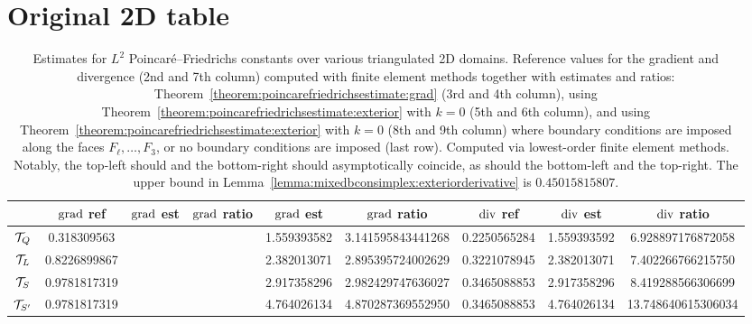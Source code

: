 \documentclass[10pt,a4paper]{article}
\begin{document}
\color{black}









\section{Original 2D table}



\begin{table}[t]
    \centering
    \begin{tabular}{|c|c|c|c|c|c|c|c|c|}
        \hline
                        & $\operatorname{grad}$ ref  & $\operatorname{grad}$ est & $\operatorname{grad}$ ratio      & $\operatorname{grad}$ est & $\operatorname{grad}$ ratio      & $\operatorname{div}$ ref  & $\operatorname{div}$ est  & $\operatorname{div}$ ratio \\ 
        \hline
        ${\mathcal T}_{Q}$     & 0.318309563  &             &                    & 1.559393582 & 3.141595843441268  & 0.2250565284       & 1.559393592        &  6.928897176872058 \\ 
        \hline
        ${\mathcal T}_{L}$     & 0.8226899867 &             &                    & 2.382013071 & 2.895395724002629  & 0.3221078945       & 2.382013071        &  7.402266766215750 \\ 
        \hline
        ${\mathcal T}_{S}$     & 0.9781817319 &             &                    & 2.917358296 & 2.982429747636027  & 0.3465088853       & 2.917358296        &  8.419288566306699 \\ 
        \hline
        ${\mathcal T}_{S'}$    & 0.9781817319 &             &                    & 4.764026134 & 4.870287369552950  & 0.3465088853       & 4.764026134        & 13.748640615306034 \\ 
        \hline
    \end{tabular}
    \caption{
    Estimates for $L^2$ Poincar\'e--Friedrichs constants over various triangulated 2D domains.
    Reference values for the gradient and divergence (2nd and 7th column) computed with finite element methods together with estimates and ratios: 
    Theorem~\ref{theorem:poincarefriedrichsestimate:grad} (3rd and 4th column), using Theorem~\ref{theorem:poincarefriedrichsestimate:exterior} with $k=0$ (5th and 6th column), 
    and using Theorem~\ref{theorem:poincarefriedrichsestimate:exterior} with $k=0$ (8th and 9th column)
    where boundary conditions are imposed along the faces $F_{\ell}, \dots, F_3$, or no boundary conditions are imposed (last row). 
    Computed via lowest-order finite element methods. 
    Notably, the top-left should and the bottom-right should asymptotically coincide, as should the bottom-left and the top-right.
    The upper bound in Lemma~\ref{lemma:mixedbconsimplex:exteriorderivative} is $0.45015815807$.
    }\label{table:referencepoincarefriedrichs}
\end{table}
\end{document}
